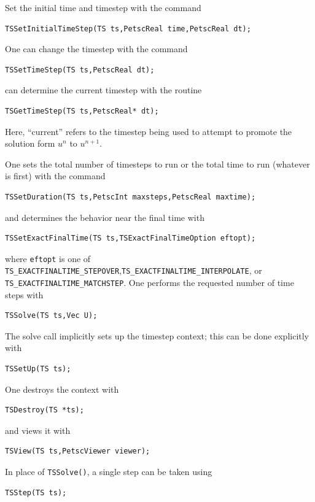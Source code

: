 \noindent Set the initial time and timestep with the command
\begin{lstlisting}
TSSetInitialTimeStep(TS ts,PetscReal time,PetscReal dt);
\end{lstlisting}
One can change the timestep with the command
\begin{lstlisting}
TSSetTimeStep(TS ts,PetscReal dt);
\end{lstlisting}
can determine the current timestep with the routine
\begin{lstlisting}
TSGetTimeStep(TS ts,PetscReal* dt);
\end{lstlisting}
Here, ``current'' refers to the timestep being used to attempt to
promote the solution form $ u^n $ to $ u^{n+1}. $

\noindent One sets the total number of timesteps to run or the total time to run
(whatever is first) with the command
\begin{lstlisting}
TSSetDuration(TS ts,PetscInt maxsteps,PetscReal maxtime);
\end{lstlisting}
and determines the behavior near the final time with
\begin{lstlisting}
TSSetExactFinalTime(TS ts,TSExactFinalTimeOption eftopt);
\end{lstlisting}
where \lstinline{eftopt} is one of \lstinline{TS_EXACTFINALTIME_STEPOVER},\lstinline{TS_EXACTFINALTIME_INTERPOLATE}, or\break
\lstinline{TS_EXACTFINALTIME_MATCHSTEP}.
One performs the requested number of time steps with
\begin{lstlisting}
TSSolve(TS ts,Vec U);
\end{lstlisting}
The solve call implicitly sets up the timestep context;
this can be done explicitly with
\begin{lstlisting}
TSSetUp(TS ts);
\end{lstlisting}
One destroys the context with
\begin{lstlisting}
TSDestroy(TS *ts);
\end{lstlisting}
and views it with
\begin{lstlisting}
TSView(TS ts,PetscViewer viewer);
\end{lstlisting}
In place of \lstinline{TSSolve()}, a single step can be taken using
\begin{lstlisting}
TSStep(TS ts);
\end{lstlisting}

